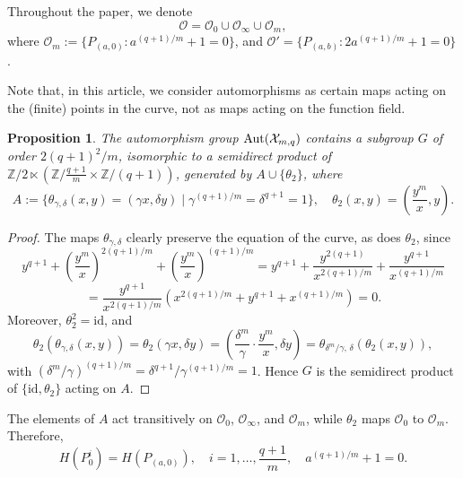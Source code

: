 \documentclass[12pt]{amsart}
\newtheorem{proposition}[theorem]{Proposition}
\theoremstyle{remark}
\theoremstyle{definition}
\def\Aut{{\rm Aut}}
\begin{document}
Throughout the paper, we denote
$$\mathcal{O} = \mathcal{O}_0 \cup \mathcal{O}_{\infty} \cup 
\mathcal{O}_m,$$
where $\mathcal{O}_m := \{P_{(a,0)} : a^{(q+1)/m} + 1 = 0\}$, and 
$\mathcal{O}' = \{P_{(a,b)} : 2a^{(q+1)/m} + 1 = 0\}$.

Note that, in this article, we consider automorphisms as certain maps acting on the (finite) points in the curve, not as maps acting on the function field.

\begin{proposition}\label{automorfismos}
The automorphism group $\Aut(\mathcal{X}_{m,q})$ contains a subgroup 
$G$ of order $2(q+1)^2/m$, isomorphic to a semidirect product of 
$\mathbb{Z}/2 \ltimes
(\mathbb{Z}/\frac{q+1}{m} \times \mathbb{Z}/(q+1))$, generated by 
$A \cup \{\theta_2\}$, where
$$A := \{\theta_{\gamma,\delta}(x,y)=(\gamma x, \delta y) \mid 
\gamma^{(q+1)/m}=\delta^{q+1}=1\}, \quad 
\theta_2(x,y) = \left(\frac{y^m}{x}, y \right).$$
\end{proposition}

\begin{proof}
The maps $\theta_{\gamma,\delta}$ clearly preserve the equation of the 
curve, as does $\theta_2$, since
\[
y^{q+1} + \left(\frac{y^m}{x}\right)^{2(q+1)/m} + 
\left(\frac{y^m}{x}\right)^{(q+1)/m}
=
y^{q+1} + \frac{y^{2(q+1)}}{x^{2(q+1)/m}} + 
\frac{y^{q+1}}{x^{(q+1)/m}}
\]
\[
=
\frac{y^{q+1}}{x^{2(q+1)/m}} \left( x^{2(q+1)/m} + y^{q+1} + 
x^{(q+1)/m} \right) = 0.
\]
Moreover, $\theta_2^2 = \mathrm{id}$, and
\[
\theta_2(\theta_{\gamma,\delta}(x,y)) =
\theta_2(\gamma x, \delta y) =
\left(\frac{\delta^m}{\gamma} \cdot \frac{y^m}{x}, \delta y\right) =
\theta_{\delta^m/\gamma,\,\delta}(\theta_2(x,y)),
\]
with $(\delta^m/\gamma)^{(q+1)/m} = \delta^{q+1}/\gamma^{(q+1)/m} = 1$. 
Hence $G$ is the semidirect product of $\{\mathrm{id},\theta_2\}$ 
acting on $A$.
\end{proof}

The elements of $A$ act transitively on $\mathcal{O}_0$, 
$\mathcal{O}_{\infty}$, and $\mathcal{O}_m$, while $\theta_2$ maps 
$\mathcal{O}_0$ to $\mathcal{O}_m$. Therefore,
$$H(P_0^i) = H(P_{(a,0)}), \quad i = 1, \ldots, \frac{q+1}{m},\quad 
a^{(q+1)/m}+1=0.$$
\end{document}
